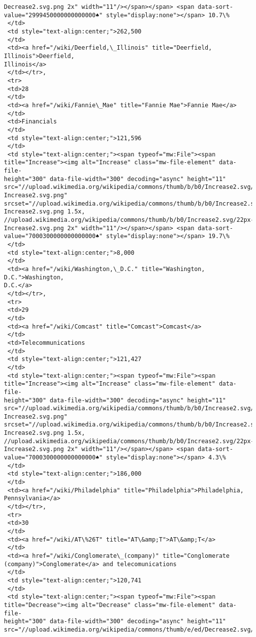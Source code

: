 \documentclass[11pt]{article}
\begin{document}
\begin{tcolorbox}[breakable, size=fbox, boxrule=.5pt, pad at break*=1mm, opacityfill=0]
\begin{Verbatim}[commandchars=\\\{\}]
Decrease2.svg.png 2x" width="11"/></span></span> <span data-sort-
value="2999450000000000000♠" style="display:none"></span> 10.7\%
 </td>
 <td style="text-align:center;">262,500
 </td>
 <td><a href="/wiki/Deerfield,\_Illinois" title="Deerfield, Illinois">Deerfield,
Illinois</a>
 </td></tr>,
 <tr>
 <td>28
 </td>
 <td><a href="/wiki/Fannie\_Mae" title="Fannie Mae">Fannie Mae</a>
 </td>
 <td>Financials
 </td>
 <td style="text-align:center;">121,596
 </td>
 <td style="text-align:center;"><span typeof="mw:File"><span
title="Increase"><img alt="Increase" class="mw-file-element" data-file-
height="300" data-file-width="300" decoding="async" height="11"
src="//upload.wikimedia.org/wikipedia/commons/thumb/b/b0/Increase2.svg/11px-
Increase2.svg.png"
srcset="//upload.wikimedia.org/wikipedia/commons/thumb/b/b0/Increase2.svg/17px-
Increase2.svg.png 1.5x,
//upload.wikimedia.org/wikipedia/commons/thumb/b/b0/Increase2.svg/22px-
Increase2.svg.png 2x" width="11"/></span></span> <span data-sort-
value="7000300000000000000♠" style="display:none"></span> 19.7\%
 </td>
 <td style="text-align:center;">8,000
 </td>
 <td><a href="/wiki/Washington,\_D.C." title="Washington, D.C.">Washington,
D.C.</a>
 </td></tr>,
 <tr>
 <td>29
 </td>
 <td><a href="/wiki/Comcast" title="Comcast">Comcast</a>
 </td>
 <td>Telecommunications
 </td>
 <td style="text-align:center;">121,427
 </td>
 <td style="text-align:center;"><span typeof="mw:File"><span
title="Increase"><img alt="Increase" class="mw-file-element" data-file-
height="300" data-file-width="300" decoding="async" height="11"
src="//upload.wikimedia.org/wikipedia/commons/thumb/b/b0/Increase2.svg/11px-
Increase2.svg.png"
srcset="//upload.wikimedia.org/wikipedia/commons/thumb/b/b0/Increase2.svg/17px-
Increase2.svg.png 1.5x,
//upload.wikimedia.org/wikipedia/commons/thumb/b/b0/Increase2.svg/22px-
Increase2.svg.png 2x" width="11"/></span></span> <span data-sort-
value="7000300000000000000♠" style="display:none"></span> 4.3\%
 </td>
 <td style="text-align:center;">186,000
 </td>
 <td><a href="/wiki/Philadelphia" title="Philadelphia">Philadelphia,
Pennsylvania</a>
 </td></tr>,
 <tr>
 <td>30
 </td>
 <td><a href="/wiki/AT\%26T" title="AT\&amp;T">AT\&amp;T</a>
 </td>
 <td><a href="/wiki/Conglomerate\_(company)" title="Conglomerate
(company)">Conglomerate</a> and telecomunications
 </td>
 <td style="text-align:center;">120,741
 </td>
 <td style="text-align:center;"><span typeof="mw:File"><span
title="Decrease"><img alt="Decrease" class="mw-file-element" data-file-
height="300" data-file-width="300" decoding="async" height="11"
src="//upload.wikimedia.org/wikipedia/commons/thumb/e/ed/Decrease2.svg/11px-

\end{Verbatim}
\end{tcolorbox}
\end{document}
